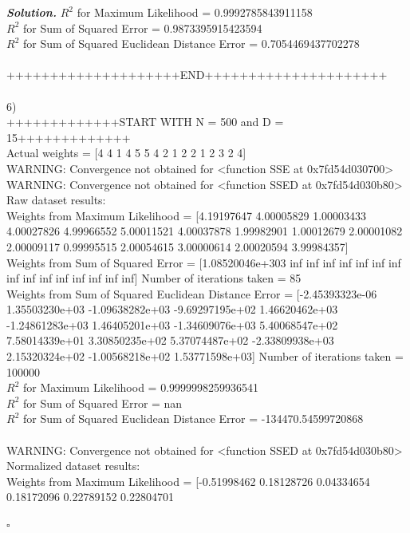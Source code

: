 \documentclass[8pt]{article}
\newenvironment{solution}[1][\it{Solution}]{\textbf{#1. } }{$\square$}
\begin{document}
\begin{solution}
$R^2$ for Maximum Likelihood = 0.9992785843911158 \\
$R^2$ for Sum of Squared Error = 0.9873395915423594 \\
$R^2$ for Sum of Squared Euclidean Distance Error = 0.7054469437702278 \\
\\
++++++++++++++++++++END+++++++++++++++++++++\\
\\
6)\\
+++++++++++++START WITH N = 500 and D = 15+++++++++++++\\
Actual weights =  [4 4 1 4 5 5 4 2 1 2 2 1 2 3 2 4] \\
WARNING: Convergence not obtained for <function SSE at 0x7fd54d030700>\\
WARNING: Convergence not obtained for <function SSED at 0x7fd54d030b80>\\
Raw dataset results:\\
Weights from Maximum Likelihood = [4.19197647 4.00005829 1.00003433 4.00027826 4.99966552 5.00011521
 4.00037878 1.99982901 1.00012679 2.00001082 2.00009117 0.99995515
 2.00054615 3.00000614 2.00020594 3.99984357] \\
Weights from Sum of Squared Error = [1.08520046e+303             inf             inf             inf
             inf             inf             inf             inf
             inf             inf             inf             inf
             inf             inf             inf             inf] Number of iterations taken =  85 \\
Weights from Sum of Squared Euclidean Distance Error = [-2.45393323e-06  1.35503230e+03 -1.09638282e+03 -9.69297195e+02
  1.46620462e+03 -1.24861283e+03  1.46405201e+03 -1.34609076e+03
  5.40068547e+02  7.58014339e+01  3.30850235e+02  5.37074487e+02
 -2.33809938e+03  2.15320324e+02 -1.00568218e+02  1.53771598e+03] Number of iterations taken =  100000 \\
$R^2$ for Maximum Likelihood = 0.9999998259936541 \\
$R^2$ for Sum of Squared Error = nan \\
$R^2$ for Sum of Squared Euclidean Distance Error = -134470.54599720868 \\
\\
WARNING: Convergence not obtained for <function SSED at 0x7fd54d030b80>\\
Normalized dataset results:\\
Weights from Maximum Likelihood = [-0.51998462  0.18128726  0.04334654  0.18172096  0.22789152  0.22804701

\end{solution}
\end{document}

